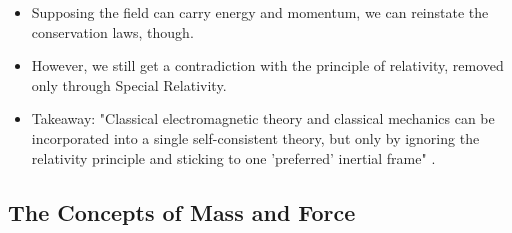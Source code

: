 \documentclass[../notes.tex]{subfiles}
\begin{document}
\begin{itemize}
\begin{enumerate}
\begin{itemize}
            \item Supposing the field can carry energy and momentum, we can reinstate the conservation laws, though.
            \item However, we still get a contradiction with the principle of relativity, removed only through Special Relativity.
            \item Takeaway: "Classical electromagnetic theory and classical mechanics can be incorporated into a single self-consistent theory, but only by ignoring the relativity principle and sticking to one 'preferred' inertial frame" \parencite[10]{bib:KibbleBerkshire}.
        \end{itemize}
    \end{enumerate}
\end{itemize}


\subsection*{The Concepts of Mass and Force}
\end{document}
